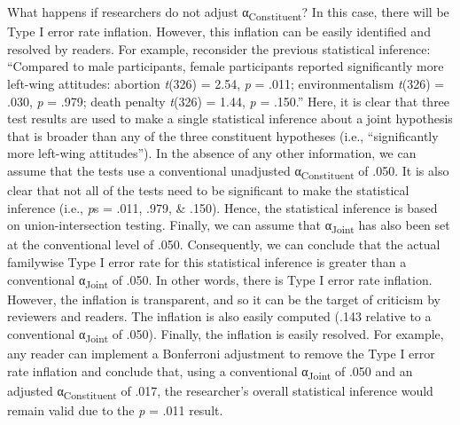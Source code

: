 \documentclass[authordate, empirical]{jote-new-article}
\begin{document}
	What happens if researchers do not adjust α\textsubscript{Constituent}? In this case, there will be Type I error rate inflation. However, this inflation can be easily identified and resolved by readers. For example, reconsider the previous statistical inference: “Compared to male participants, female participants reported significantly more left-wing attitudes: abortion \emph{t}(326) = 2.54, \emph{p} = .011; environmentalism\textsubscript{ }\emph{t}(326) = .030, \emph{p} = .979; death penalty\textsubscript{ }\emph{t}(326) = 1.44, \emph{p} = .150.” Here, it is clear that three test results are used to make a single statistical inference about a joint hypothesis that is broader than any of the three constituent hypotheses (i.e., “significantly more left-wing attitudes”). In the absence of any other information, we can assume that the tests use a conventional unadjusted α\textsubscript{Constituent} of .050. It is also clear that not all of the tests need to be significant to make the statistical inference (i.e., \emph{p}s\emph{ }= .011, .979, \& .150). Hence, the statistical inference is based on union-intersection testing. Finally, we can assume that α\textsubscript{Joint }has also been set at the conventional level of .050. Consequently, we can conclude that the actual familywise Type I error rate for this statistical inference is greater than a conventional α\textsubscript{Joint} of .050. In other words, there is Type I error rate inflation. However, the inflation is transparent, and so it can be the target of criticism by reviewers and readers. The inflation is also easily computed (.143 relative to a conventional α\textsubscript{Joint} of .050). Finally, the inflation is easily resolved. For example, any reader can implement a Bonferroni adjustment to remove the Type I error rate inflation and conclude that, using a conventional α\textsubscript{Joint} of .050 and an adjusted α\textsubscript{Constituent} of .017, the researcher's overall statistical inference would remain valid due to the \emph{p} = .011 result.
\end{document}
